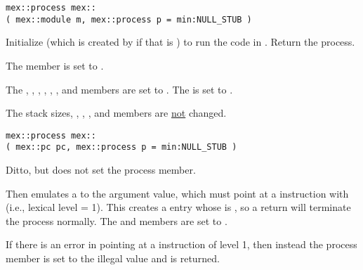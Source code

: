 \documentclass[12pt]{article}
\begin{document}
{\tt mex::process mex::} \\
\hspace*{10em}\verb|( mex::module m, mex::process p = min:NULL_STUB )|
\begin{indpar}
Initialize  (which is created by 
if that is ) to run the code in .
Return the process.

The  member is set to .

The , , , ,
, , and
 members are set to .
The  is set to .

The stack sizes, , ,
, and  members are
\underline{not} changed.

\end{indpar}

{\tt mex::process mex::} \\
\hspace*{10em}\verb|( mex::pc pc, mex::process p = min:NULL_STUB )|
\begin{indpar}
Ditto, but does not set the process  member.

Then emulates a  to the  argument
value, which must point at a  instruction with 
(i.e., lexical level = 1).
This creates a  entry whose
 is , so a return
will terminate the process normally.  The 
and  members are set to .

If there is an error in pointing at a  instruction of level 1,
then instead the process  member is set to the illegal value
 and  is returned.
\end{indpar}
\end{document}

